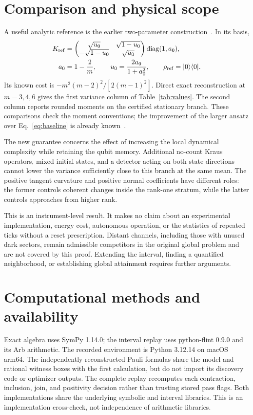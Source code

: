 \documentclass[aps,pra,reprint,amsmath,amssymb,longbibliography]{revtex4-2}
\newcommand{\diag}{\operatorname{diag}}
\newcommand{\ket}[1]{|#1\rangle}
\newcommand{\bra}[1]{\langle#1|}
\begin{document}
\section{Comparison and physical scope}\label{sec:comparison}
A useful analytic reference is the earlier two-parameter construction~\cite{Budroni2021}. In its basis,
\begin{align}
 K_{\rm ref}&=\begin{pmatrix}\sqrt{u_0}&\sqrt{1-u_0}\\-\sqrt{1-u_0}&\sqrt{u_0}\end{pmatrix}
 \diag(1,a_0),\nonumber\\
 a_0&=1-\frac2m,\qquad u_0=\frac{2a_0}{1+a_0^2},\qquad \rho_{\rm ref}=\ket0\bra0.
 \label{eq:baseline}
\end{align}
Its known cost is $-m^2(m-2)^2/[2(m-1)^2]$. Direct exact reconstruction at $m=3,4,6$ gives the first variance column of Table~\ref{tab:values}. The second column reports rounded moments on the certified stationary branch. These comparisons check the moment conventions; the improvement of the larger ansatz over Eq.~\eqref{eq:baseline} is already known~\cite{Olamaei2026}.



The new guarantee concerns the effect of increasing the local dynamical complexity while retaining the qubit memory. Additional no-count Kraus operators, mixed initial states, and a detector acting on both state directions cannot lower the variance sufficiently close to this branch at the same mean. The positive tangent curvature and positive normal coefficients have different roles: the former controls coherent changes inside the rank-one stratum, while the latter controls approaches from higher rank.

This is an instrument-level result. It makes no claim about an experimental implementation, energy cost, autonomous operation, or the statistics of repeated ticks without a reset prescription. Distant channels, including those with unused dark sectors, remain admissible competitors in the original global problem and are not covered by this proof. Extending the interval, finding a quantified neighborhood, or establishing global attainment requires further arguments.

\section{Computational methods and availability}\label{sec:methods}
Exact algebra uses SymPy 1.14.0; the interval replay uses python-flint 0.9.0 and its Arb arithmetic. The recorded environment is Python 3.12.14 on macOS arm64. The independently reconstructed Pauli formulas share the model and rational witness boxes with the first calculation, but do not import its discovery code or optimizer outputs. The complete replay recomputes each contraction, inclusion, join, and positivity decision rather than trusting stored pass flags. Both implementations share the underlying symbolic and interval libraries. This is an implementation cross-check, not independence of arithmetic libraries.
\end{document}
